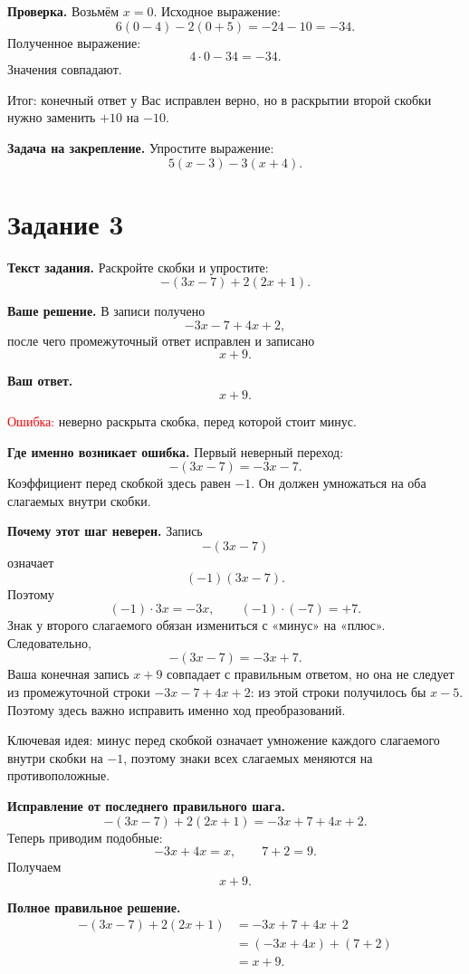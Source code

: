 \documentclass[12pt,a4paper]{article}
\begin{document}
\textbf{Проверка.}
Возьмём $x=0$. Исходное выражение:
\[
6(0-4)-2(0+5)=-24-10=-34.
\]
Полученное выражение:
\[
4\cdot 0-34=-34.
\]
Значения совпадают.

\textcolor{teal!60!black}{Итог:} конечный ответ у Вас исправлен верно, но в раскрытии второй скобки нужно заменить $+10$ на $-10$.

\textbf{Задача на закрепление.}
Упростите выражение:
\[
5(x-3)-3(x+4).
\]

\newpage
{}\label{task:3}
\section*{Задание 3}

\textbf{Текст задания.}
Раскройте скобки и упростите:
\[
-(3x-7)+2(2x+1).
\]

\textbf{Ваше решение.}
В записи получено
\[
-3x-7+4x+2,
\]
после чего промежуточный ответ исправлен и записано
\[
x+9.
\]

\textbf{Ваш ответ.}
\[
x+9.
\]

\textcolor{red}{Ошибка:} неверно раскрыта скобка, перед которой стоит минус.

\textbf{Где именно возникает ошибка.}
Первый неверный переход:
\[
-(3x-7)=-3x-7.
\]
Коэффициент перед скобкой здесь равен $-1$. Он должен умножаться на оба слагаемых внутри скобки.

\textbf{Почему этот шаг неверен.}
Запись
\[
-(3x-7)
\]
означает
\[
(-1)(3x-7).
\]
Поэтому
\[
(-1)\cdot 3x=-3x,
\qquad
(-1)\cdot(-7)=+7.
\]
Знак у второго слагаемого обязан измениться с «минус» на «плюс». Следовательно,
\[
-(3x-7)=-3x+7.
\]
Ваша конечная запись $x+9$ совпадает с правильным ответом, но она не следует из промежуточной строки $-3x-7+4x+2$: из этой строки получилось бы $x-5$. Поэтому здесь важно исправить именно ход преобразований.

\textcolor{blue!60!black}{Ключевая идея:} минус перед скобкой означает умножение каждого слагаемого внутри скобки на $-1$, поэтому знаки всех слагаемых меняются на противоположные.

\textbf{Исправление от последнего правильного шага.}
\[
-(3x-7)+2(2x+1)=-3x+7+4x+2.
\]
Теперь приводим подобные:
\[
-3x+4x=x,
\qquad
7+2=9.
\]
Получаем
\[
x+9.
\]

\textbf{Полное правильное решение.}
\[
\begin{aligned}
-(3x-7)+2(2x+1)
&=-3x+7+4x+2\\
&=(-3x+4x)+(7+2)\\
&=x+9.
\end{aligned}
\]
\end{document}
